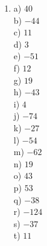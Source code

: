 \documentclass{exam}
\begin{document}
\begin{multicols*}{4}
\begin{enumerate}
\item 	a) $40$ \\
		b) $-44$ \\
		c) $11$ \\
		d) $3$ \\
		e) $-51$ \\
		f) $12$ \\
		g) $19$ \\
		h) $-43$ \\
		i) $4$ \\
		j) $-74$ \\
		k) $-27$ \\
		l) $-54$ \\
		m) $-62$ \\
		n) $19$ \\
		o) $43$ \\
		p) $53$ \\
		q) $-38$ \\
		r) $-124$ \\
		s) $-37$ \\
		t) $11$ \\

\end{enumerate}
\end{multicols*}
\end{document}
